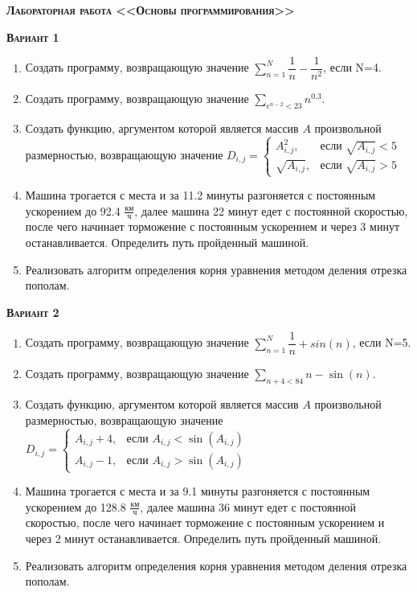 \textsc{\textbf{Лабораторная работа <<Основы программирования>>}}

\textsc{\textbf{Вариант 1}}
\begin{enumerate}
\item  Создать программу, возвращающую значение $\sum\limits_{n=1}^{N} {\dfrac{1}{n} -\dfrac{1}{n^2}}$, если N=4. 
\item  Создать программу, возвращающую значение $\sum\limits_{e^{n-2}<  23} {n}^{0.3}                     $. 
\item Создать функцию, аргументом которой является массив $A$ произвольной размерностью, возвращающую значение $D_{i,j}=\begin{cases} A_{i,j}^2, & \text{если } \sqrt{A_{i,j}}<5 \\ \sqrt{A_{i,j}}, & \text{если } \sqrt{A_{i,j}}>5 \end{cases}              $ 
\item Машина трогается с места и за 11.2 минуты разгоняется с постоянным ускорением до 92.4 ${\frac{км}{ч}}$, далее машина   22 минут едет с постоянной скоростью, после чего начинает торможение с постоянным ускорением и через   3 минут останавливается. Определить путь пройденный машиной.  \item Реализовать алгоритм определения корня уравнения методом деления отрезка пополам.                                                                                                                                                                                              

\end{enumerate}
\textsc{\textbf{Вариант 2}}
\begin{enumerate}
\item  Создать программу, возвращающую значение $\sum\limits_{n=1}^{N} {\dfrac{1}{n} +sin(n)}        $, если N=5. 
\item  Создать программу, возвращающую значение $\sum\limits_{n+4<      84} n-\sin(n)                     $. 
\item Создать функцию, аргументом которой является массив $A$ произвольной размерностью, возвращающую значение $D_{i,j}=\begin{cases} A_{i,j}+4, & \text{если } {A_{i,j}}<\sin(A_{i,j}) \\  A_{i,j}-1, & \text{если } {A_{i,j}}>\sin(A_{i,j}) \end{cases}    $ 
\item Машина трогается с места и за  9.1 минуты разгоняется с постоянным ускорением до 128.8 ${\frac{км}{ч}}$, далее машина   36 минут едет с постоянной скоростью, после чего начинает торможение с постоянным ускорением и через   2 минут останавливается. Определить путь пройденный машиной.  \item Реализовать алгоритм определения корня уравнения методом деления отрезка пополам.                                                                                                                                                                                              

\end{enumerate}
